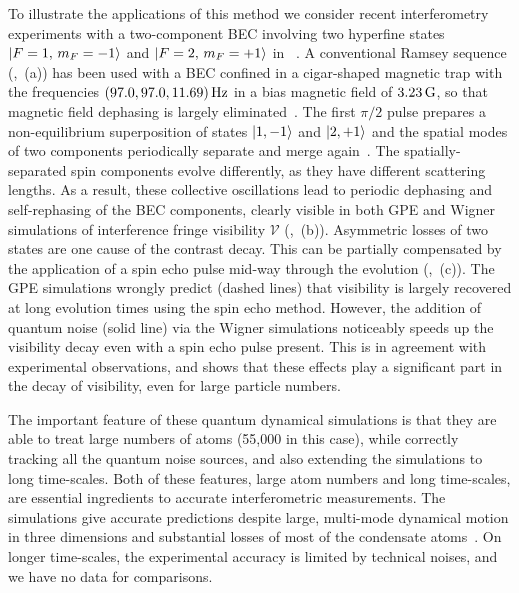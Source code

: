 To illustrate the applications of this method we consider recent interferometry
experiments with a two-component BEC involving two hyperfine states
${\mbox{\ensuremath{\vert F=1,\, m_F=-1 \rangle}}}$ and ${\mbox{\ensuremath{\vert F=2,\, m_F=+1 \rangle}}}$ in \Rb~\cite{Egorov2011}.
A conventional Ramsey sequence (,~(a)) has been used
with a BEC confined in a cigar-shaped magnetic trap with the frequencies $(97.0, 97.0, 11.69)\mbox{\ensuremath{\,\mathrm{Hz}}}$
in a bias magnetic field of $3.23\mbox{\ensuremath{\,\mathrm{G}}}$, so that magnetic field dephasing is largely eliminated~\cite{Hall1998}.
The first $\pi/2$ pulse prepares a non-equilibrium superposition of states ${\mbox{\ensuremath{\vert 1,-1 \rangle}}}$ and ${\mbox{\ensuremath{\vert 2,+1 \rangle}}}$
and the spatial modes of two components periodically separate and merge again~\cite{Mertes2007}.
The spatially-separated spin components evolve differently, as they have
different scattering lengths.
As a result, these collective oscillations lead to periodic dephasing and
self-rephasing of the BEC components, clearly visible in both GPE and Wigner
simulations of interference fringe visibility
$\mathcal{V}$ (,~(b)).
Asymmetric losses of two states are one cause of the contrast decay.
This can be partially compensated by the application of a spin echo pulse
mid-way through the evolution (,~(c)).
The GPE simulations wrongly predict (dashed lines) that visibility is largely
recovered at long evolution times using the spin echo method.
However, the addition of quantum noise (solid line) via the Wigner simulations
noticeably speeds up the visibility decay even with a spin echo pulse present.
This is in agreement with experimental observations, and shows that these
effects play a significant part in the decay of visibility, even for
large particle numbers.

The important feature of these quantum dynamical simulations
is that they are able to treat large numbers of atoms (55,000 in this case),
while correctly tracking all the quantum noise sources, and also extending the simulations to long time-scales.
Both of these features, large atom numbers and long time-scales,
are essential ingredients to accurate interferometric measurements.
The simulations give accurate predictions despite large, multi-mode dynamical motion in three dimensions
and substantial losses of most of the condensate atoms~\cite{Egorov2011}.
On longer time-scales, the experimental accuracy is limited by technical noises, and we have no data for comparisons.

